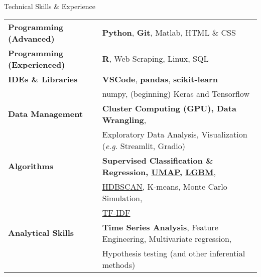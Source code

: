 \documentclass{resume} %
\begin{document}

\begin{rSection}{Technical Skills \& Experience}

\begin{small}

\begin{tabular}{ @{} >{\bfseries}l @{\hspace{6ex}} l }
Programming (Advanced)    & \textbf{Python}, \textbf{Git}, Matlab, HTML \& CSS \\ 
Programming (Experienced) & \textbf{R}, Web Scraping, Linux, SQL \\
IDEs \& Libraries         & \textbf{VSCode}, \textbf{pandas}, \textbf{scikit-learn} \\ & numpy, (beginning) Keras and Tensorflow \\
Data Management           & \textbf{Cluster Computing (GPU), Data Wrangling}, \\ & Exploratory Data Analysis, Visualization (\emph{e.g.} Streamlit, Gradio) \\
Algorithms                & \textbf{Supervised Classification \& Regression, \href{https://proceedings.neurips.cc/paper/2017/file/6449f44a102fde848669bdd9eb6b76fa-Paper.pdf}{UMAP}, \href{https://lightgbm.readthedocs.io/en/latest/}{LGBM}}, \\ & \href{https://arxiv.org/pdf/1705.07321.pdf}{HDBSCAN}, K-means, Monte Carlo Simulation, \\ & \href{https://scikit-learn.org/stable/modules/generated/sklearn.feature_extraction.text.TfidfVectorizer.html}{TF-IDF} \\
Analytical Skills         & \textbf{Time Series Analysis}, Feature Engineering, Multivariate regression, \\ & Hypothesis testing (and other inferential methods) \\
\end{tabular}

\end{small}

\end{rSection}

\end{document}
